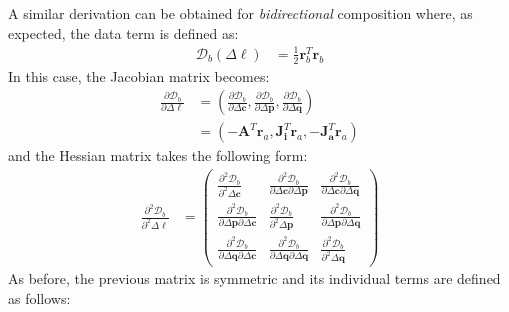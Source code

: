 A similar derivation can be obtained for \emph{bidirectional} composition where, as expected, the data term is defined as:
\begin{equation}
    \begin{aligned}
		\mathcal{D}_b(\Delta \boldsymbol{\ell}) & = \frac{1}{2}\mathbf{r}_b^T \mathbf{r}_b
    \label{eq:bidirectional_data}
    \end{aligned}
\end{equation}
In this case, the Jacobian matrix becomes:
\begin{equation}
    \begin{aligned}
		\frac{\partial \mathcal{D}_b}{\partial \Delta \boldsymbol{\ell}} & = \left( \frac{\partial \mathcal{D}_b}{\partial \Delta \mathbf{c}}, \frac{\partial \mathcal{D}_b}{\partial \Delta \mathbf{p}}, \frac{\partial \mathcal{D}_b}{\partial \Delta \mathbf{q}} \right)
		\\
		& = \left( -\mathbf{A}^T \mathbf{r}_a, \mathbf{J}_{\mathbf{i}}^T \mathbf{r}_a, -\mathbf{J}_{\mathbf{a}}^T \mathbf{r}_a \right)
    \label{eq:bidirectional_newton_jacobian}
    \end{aligned}
\end{equation}
and the Hessian matrix takes the following form:
\begin{equation}
    \begin{aligned}
		\frac{\partial^2 \mathcal{D}_b}{\partial^2 \Delta \boldsymbol{\ell}} & =
		\begin{pmatrix}
			\frac{\partial^2 \mathcal{D}_b}{\partial^2 \Delta \mathbf{c}} & \frac{\partial^2 \mathcal{D}_b}{\partial \Delta \mathbf{c} \partial \Delta \mathbf{p}} & \frac{\partial^2 \mathcal{D}_b}{\partial \Delta \mathbf{c} \partial \Delta \mathbf{q}}
			\\
			\frac{\partial^2 \mathcal{D}_b}{\partial \Delta \mathbf{p} \partial \Delta \mathbf{c}} & \frac{\partial^2 \mathcal{D}_b}{\partial^2 \Delta \mathbf{p}} & \frac{\partial^2 \mathcal{D}_b}{\partial \Delta \mathbf{p} \partial \Delta \mathbf{q}}
			\\
			\frac{\partial^2 \mathcal{D}_b}{\partial \Delta \mathbf{q} \partial \Delta \mathbf{c}} & \frac{\partial^2 \mathcal{D}_b}{\partial \Delta \mathbf{q} \partial \Delta \mathbf{q}}
			& \frac{\partial^2 \mathcal{D}_b}{\partial^2 \Delta \mathbf{q}}
		\end{pmatrix}
    \label{eq:bidirectional_newton_hessian}
    \end{aligned}
\end{equation}
As before, the previous matrix is symmetric and its individual terms are defined as follows:
